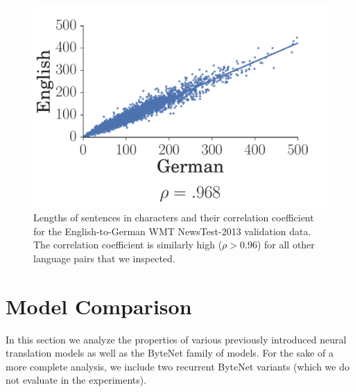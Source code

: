 \documentclass{article}
\begin{document}
\begin{figure}[t]
    \centering
    \includegraphics[scale=.205, trim={0.1cm 0 0 0},clip]{sentence_length/de_en.pdf}
    \caption{Lengths of sentences in characters and their correlation coefficient for the English-to-German WMT NewsTest-2013 validation data. The correlation coefficient is similarly high ($\rho>0.96$) for all other language pairs that we inspected.}
\label{fig:corr}
\end{figure}



\section{Model Comparison}
\label{modelcomp}

In this section we analyze the properties of various previously introduced neural translation models as well as the ByteNet family of models. For the sake of a more complete analysis, we include two recurrent ByteNet variants (which we do not evaluate in the experiments).
\end{document}
